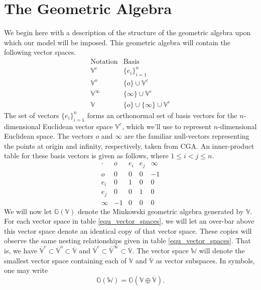 \documentclass{birkjour}
\theoremstyle{definition}
\theoremstyle{remark}
\numberwithin{equation}{section}
\newcommand{\G}{\mathbb{G}}
\newcommand{\V}{\mathbb{V}}
\newcommand{\Vb}{\mathbb{\overline{V}}}
\newcommand{\W}{\mathbb{W}}
\newcommand{\nvao}{o}
\newcommand{\nvai}{\infty}
\begin{document}
\section{The Geometric Algebra}

We begin here with a description of the structure of the geometric algebra upon
which our model will be imposed.  This
geometric algebra will contain the following vector spaces.
\begin{equation}\label{equ_vector_spaces}
\begin{array}{ll}
\mbox{Notation} & \mbox{Basis} \\
\hline
\V^e & \{e_i\}_{i=1}^n \\
\V^{\nvao} & \{\nvao\}\cup\V^e \\
\V^{\nvai} & \{\nvai\}\cup\V^e \\
\V & \{\nvao\}\cup\{\nvai\}\cup\V^e
\end{array}
\end{equation}
The set of vectors $\{e_i\}_{i=1}^n$ forms an orthonormal set of basis
vectors for the $n$-dimensional Euclidean vector space $\V^e$, which we'll
use to represent $n$-dimensional Euclidean space.
The vectors $\nvao$ and $\nvai$ are the familiar null-vectors representing the
points at origin and infinity, respectively, taken from CGA.
An inner-product table for these basis vectors is given as follows, where
$1\leq i<j\leq n$.
\begin{equation}\label{equ_basis_mul_table}
\begin{array}{c|cccc}
\cdot & \nvao & e_i & e_j & \nvai \\
\hline
\nvao & 0 & 0 & 0 & -1 \\
e_i & 0 & 1 & 0 & 0 \\
e_j & 0 & 0 & 1 & 0 \\
\nvai & -1 & 0 & 0 & 0
\end{array}
\end{equation}
We will now let $\G(\V)$ denote the Minkowski geometric algebra generated by $\V$.
For each vector space in table \eqref{equ_vector_spaces}, we will let an over-bar
above this vector space denote an identical copy of that vector space.  These copies
will observe the same nesting relationships given in table \eqref{equ_vector_spaces}.
That is, we have $\Vb^e\subset \Vb^o\subset \Vb$ and $\Vb^e\subset \Vb^\infty\subset \Vb$.
The vector
space $\W$ will denote the smallest vector space containing each of $\V$ and $\Vb$
as vector subspaces.  In symbols, one may write
\begin{equation}
\G(\W) = \G(\V\oplus\Vb).
\end{equation}
\end{document}
